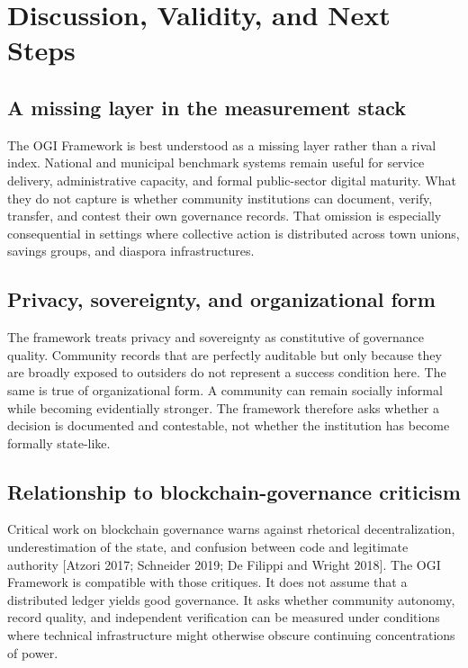 \documentclass[sigconf,anonymous]{acmart}
\begin{document}
\section{Discussion, Validity, and Next Steps}

\subsection{A missing layer in the measurement stack}

The OGI Framework is best understood as a missing layer rather than a rival index. National and municipal benchmark systems remain useful for service delivery, administrative capacity, and formal public-sector digital maturity. What they do not capture is whether community institutions can document, verify, transfer, and contest their own governance records. That omission is especially consequential in settings where collective action is distributed across town unions, savings groups, and diaspora infrastructures.

\subsection{Privacy, sovereignty, and organizational form}

The framework treats privacy and sovereignty as constitutive of governance quality. Community records that are perfectly auditable but only because they are broadly exposed to outsiders do not represent a success condition here. The same is true of organizational form. A community can remain socially informal while becoming evidentially stronger. The framework therefore asks whether a decision is documented and contestable, not whether the institution has become formally state-like.

\subsection{Relationship to blockchain-governance criticism}

Critical work on blockchain governance warns against rhetorical decentralization, underestimation of the state, and confusion between code and legitimate authority [Atzori 2017; Schneider 2019; De Filippi and Wright 2018]. The OGI Framework is compatible with those critiques. It does not assume that a distributed ledger yields good governance. It asks whether community autonomy, record quality, and independent verification can be measured under conditions where technical infrastructure might otherwise obscure continuing concentrations of power.
\end{document}
